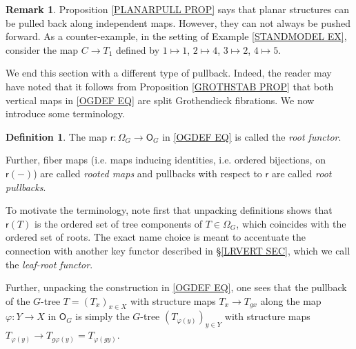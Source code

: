 \documentclass[a4paper,10pt
,draft
]{article}%
\numberwithin{equation}{section}
\numberwithin{figure}{section}
\theoremstyle{definition} %
\newtheorem{definition}[equation]{Definition}%
\newtheorem{remark}[equation]{Remark}%
\newcommand{\1}{\ensuremath{\mathbbm 1}}%
\begin{document}
\begin{remark}\label{PULLPLANAR REM}
Proposition \ref{PLANARPULL PROP} says that planar structures can be pulled back along independent maps. However, they can not always be pushed forward. As a counter-example, in the setting of Example \ref{STANDMODEL EX}, consider the map $C \to T_1$ defined by $1 \mapsto 1$, $2 \mapsto 4$, $3 \mapsto 2$, $4 \mapsto 5$.
\end{remark}



We end this section with a different type of pullback.
Indeed, the reader may have noted
that it follows from 
Proposition \ref{GROTHSTAB PROP}
that both vertical maps in \eqref{OGDEF EQ}
are split Grothendieck fibrations. We now introduce some terminology.

\begin{definition}\label{ROOTPULL DEF}
The map $\mathsf{r} \colon \Omega_G \to \mathsf{O}_G$
in \eqref{OGDEF EQ} is called the \textit{root functor}.

Further, fiber maps (i.e. maps inducing identities, i.e. ordered bijections, on $\mathsf{r}(\minus)$) are called \textit{rooted maps} and pullbacks with respect to $\mathsf{r}$ are called
\textit{root pullbacks}.
\end{definition}

To motivate the terminology, 
note first that unpacking definitions shows that 
$\mathsf{r}(T)$ is the ordered set of tree components of  
$T\in \Omega_G$,
which coincides with the ordered set of roots.
The exact name choice is meant to accentuate the connection with another key functor
described in \S \ref{LRVERT SEC},
which we call the \textit{leaf-root functor}.

Further, unpacking the construction in \eqref{OGDEF EQ}, one sees that the pullback of the $G$-tree
$T = (T_x)_{x \in X}$ with structure maps $T_x \to T_{g x}$
along the map 
$\varphi \colon Y \to X$ in $\mathsf{O}_G$
is simply the $G$-tree
$(T_{\varphi(y)})_{y \in Y}$
with structure maps 
$T_{\varphi(y)} \to T_{g \varphi(y)} = T_{\varphi(g y)}$.
\end{document}
